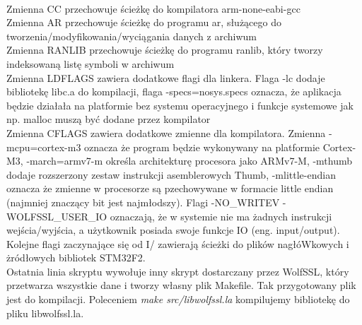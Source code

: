 \documentclass[oneside]{mgr}
\begin{document}
\\Zmienna CC przechowuje ścieżkę do kompilatora arm-none-eabi-gcc
\\Zmienna AR przechowuje ścieżkę do programu ar, służącego do tworzenia/modyfikowania/wyciągania danych z archiwum
\\Zmienna RANLIB przechowuje ścieżkę do programu ranlib, który tworzy indeksowaną listę symboli w archiwum
\\Zmienna LDFLAGS zawiera dodatkowe flagi dla linkera. Flaga -lc dodaje bibliotekę libc.a do kompilacji, flaga -specs=nosys.specs oznacza, że aplikacja będzie działała na platformie bez systemu operacyjnego i funkcje systemowe jak np. malloc muszą być dodane przez kompilator
\\Zmienna CFLAGS zawiera dodatkowe zmienne dla kompilatora. Zmienna -mcpu=cortex-m3 oznacza że program będzie wykonywany na platformie Cortex-M3, -march=armv7-m określa architekturę procesora jako ARMv7-M, -mthumb dodaje rozszerzony zestaw instrukcji asemblerowych Thumb, -mlittle-endian oznacza że zmienne w procesorze są pzechowywane w formacie little endian (najmniej znaczący bit jest najmłodszy). Flagi -NO\_WRITEV -WOLFSSL\_USER\_IO oznaczają, że w systemie nie ma żadnych instrukcji wejścia/wyjścia, a użytkownik posiada swoje funkcje IO (eng. input/output). Kolejne flagi zaczynające się od I/ zawierają ścieżki do plików nagłóWkowych i żródłowych bibliotek STM32F2.
\\Ostatnia linia skryptu wywołuje inny skrypt dostarczany przez WolfSSL, który przetwarza wszystkie dane i tworzy własny plik Makefile.
Tak przygotowany plik jest do kompilacji. Poleceniem \textit{make src/libwolfssl.la} kompilujemy bibliotekę do pliku libwolfssl.la. 
\end{document}
